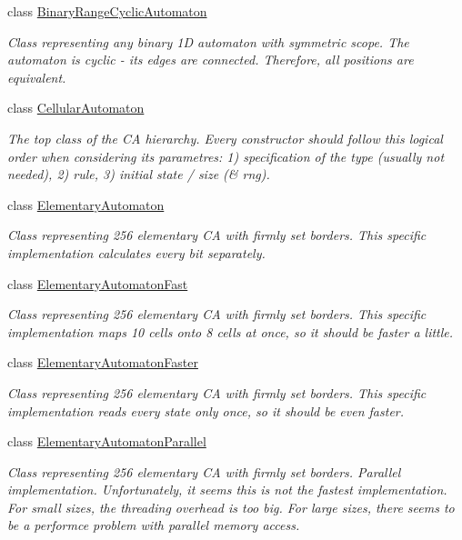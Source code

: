 \begin{DoxyCompactItemize}
class \hyperlink{class_cellular_1_1_binary_range_cyclic_automaton}{Binary\+Range\+Cyclic\+Automaton}
\begin{DoxyCompactList}\small\item\em Class representing any binary 1\+D automaton with symmetric scope. The automaton is cyclic -\/ its edges are connected. Therefore, all positions are equivalent. \end{DoxyCompactList}\item 
class \hyperlink{class_cellular_1_1_cellular_automaton}{Cellular\+Automaton}
\begin{DoxyCompactList}\small\item\em The top class of the C\+A hierarchy. Every constructor should follow this logical order when considering its parametres\+: 1) specification of the type (usually not needed), 2) rule, 3) initial state / size (\& rng). \end{DoxyCompactList}\item 
class \hyperlink{class_cellular_1_1_elementary_automaton}{Elementary\+Automaton}
\begin{DoxyCompactList}\small\item\em Class representing 256 elementary C\+A with firmly set borders. This specific implementation calculates every bit separately. \end{DoxyCompactList}\item 
class \hyperlink{class_cellular_1_1_elementary_automaton_fast}{Elementary\+Automaton\+Fast}
\begin{DoxyCompactList}\small\item\em Class representing 256 elementary C\+A with firmly set borders. This specific implementation maps 10 cells onto 8 cells at once, so it should be faster a little. \end{DoxyCompactList}\item 
class \hyperlink{class_cellular_1_1_elementary_automaton_faster}{Elementary\+Automaton\+Faster}
\begin{DoxyCompactList}\small\item\em Class representing 256 elementary C\+A with firmly set borders. This specific implementation reads every state only once, so it should be even faster. \end{DoxyCompactList}\item 
class \hyperlink{class_cellular_1_1_elementary_automaton_parallel}{Elementary\+Automaton\+Parallel}
\begin{DoxyCompactList}\small\item\em Class representing 256 elementary C\+A with firmly set borders. Parallel implementation. Unfortunately, it seems this is not the fastest implementation. For small sizes, the threading overhead is too big. For large sizes, there seems to be a performce problem with parallel memory access. \end{DoxyCompactList}\item 

\end{DoxyCompactItemize}
